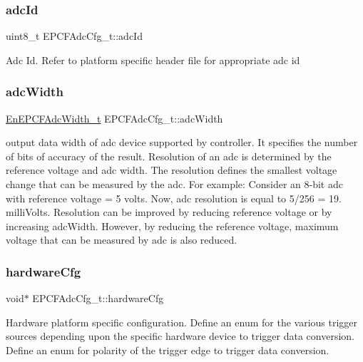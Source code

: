 \subsubsection{\texorpdfstring{adc\+Id}{adcId}}
{\footnotesize\ttfamily uint8\+\_\+t E\+P\+C\+F\+Adc\+Cfg\+\_\+t\+::adc\+Id}

Adc Id. Refer to platform specific header file for appropriate adc id \mbox{\label{structEPCFAdcCfg__t_a6a46a2be012c39266a8084121babc9db}} 
\subsubsection{\texorpdfstring{adc\+Width}{adcWidth}}
{\footnotesize\ttfamily \mbox{\hyperlink{adc_8h_a95ed8e489525daf80ac43f789951d323}{En\+E\+P\+C\+F\+Adc\+Width\+\_\+t}} E\+P\+C\+F\+Adc\+Cfg\+\_\+t\+::adc\+Width}

output data width of adc device supported by controller. It specifies the number of bits of accuracy of the result. Resolution of an adc is determined by the reference voltage and adc width. The resolution defines the smallest voltage change that can be measured by the adc. For example\+: Consider an 8-\/bit adc with reference voltage = 5 volts. Now, adc resolution is equal to 5/256 = 19. milli\+Volts. Resolution can be improved by reducing reference voltage or by increasing adc\+Width. However, by reducing the reference voltage, maximum voltage that can be measured by adc is also reduced. \mbox{\label{structEPCFAdcCfg__t_a67140923ad20ae39df63cf6cb0560f73}} 
\subsubsection{\texorpdfstring{hardware\+Cfg}{hardwareCfg}}
{\footnotesize\ttfamily void$\ast$ E\+P\+C\+F\+Adc\+Cfg\+\_\+t\+::hardware\+Cfg}

Hardware platform specific configuration. Define an enum for the various trigger sources depending upon the specific hardware device to trigger data conversion. Define an enum for polarity of the trigger edge to trigger data conversion. \mbox{\label{structEPCFAdcCfg__t_a2703092e7b7fb0b69c00cc9baa50c254}} 
